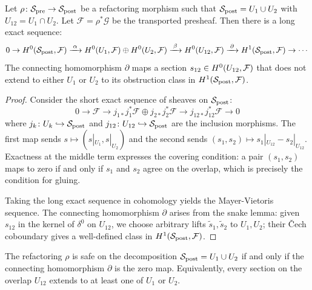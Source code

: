 \documentclass[11pt]{article}
\newcommand{\SitePre}{\Site_{\mathrm{pre}}}
\newcommand{\SitePost}{\Site_{\mathrm{post}}}
\newcommand{\RefactorMorph}{\rho}
\begin{document}
\begin{theorem}\label{thm:mayer-vietoris}
Let $\RefactorMorph \colon \SitePre \to \SitePost$ be a refactoring
morphism such that $\SitePost = U_1 \cup U_2$ with
$U_{12} = U_1 \cap U_2$.  Let $\mathcal{F} =
\RefactorMorph^*\mathcal{G}$ be the transported presheaf.  Then there
is a long exact sequence:
\[
  0 \to \Hcoh{0}(\SitePost, \mathcal{F})
    \xrightarrow{\;\alpha\;}
    \Hcoh{0}(U_1, \mathcal{F}) \oplus \Hcoh{0}(U_2, \mathcal{F})
    \xrightarrow{\;\beta\;}
    \Hcoh{0}(U_{12}, \mathcal{F})
    \xrightarrow{\;\partial\;}
    \Hcoh{1}(\SitePost, \mathcal{F})
    \to \cdots
\]
The connecting homomorphism $\partial$ maps a section $s_{12} \in
H^{0}(U_{12}, \mathcal{F})$ that does not extend to either $U_1$ or
$U_2$ to its obstruction class in $\Hcoh{1}(\SitePost, \mathcal{F})$.
\end{theorem}

\begin{proof}
Consider the short exact sequence of sheaves on $\SitePost$:
\[
  0 \to \mathcal{F} \to j_{1*}j_1^*\mathcal{F} \oplus
  j_{2*}j_2^*\mathcal{F} \to j_{12*}j_{12}^*\mathcal{F} \to 0
\]
where $j_k \colon U_k \hookrightarrow \SitePost$ and
$j_{12} \colon U_{12} \hookrightarrow \SitePost$ are the inclusion
morphisms.  The first map sends $s \mapsto (s|_{U_1}, s|_{U_2})$ and
the second sends $(s_1, s_2) \mapsto s_1|_{U_{12}} - s_2|_{U_{12}}$.
Exactness at the middle term expresses the covering condition: a pair
$(s_1, s_2)$ maps to zero if and only if $s_1$ and $s_2$ agree on the
overlap, which is precisely the condition for gluing.

Taking the long exact sequence in cohomology yields the
Mayer-Vietoris sequence.  The connecting homomorphism $\partial$ arises
from the snake lemma: given $s_{12}$ in the kernel of $\delta^0$ on
$U_{12}$, we choose arbitrary lifts $\tilde{s}_1, \tilde{s}_2$ to
$U_1, U_2$; their Čech coboundary gives a well-defined class in
$\Hcoh{1}(\SitePost, \mathcal{F})$.
\end{proof}

\begin{corollary}\label{cor:mv-criterion}
The refactoring $\RefactorMorph$ is safe on the decomposition
$\SitePost = U_1 \cup U_2$ if and only if the connecting homomorphism
$\partial$ is the zero map.  Equivalently, every section on the overlap
$U_{12}$ extends to at least one of $U_1$ or $U_2$.
\end{corollary}
\end{document}
